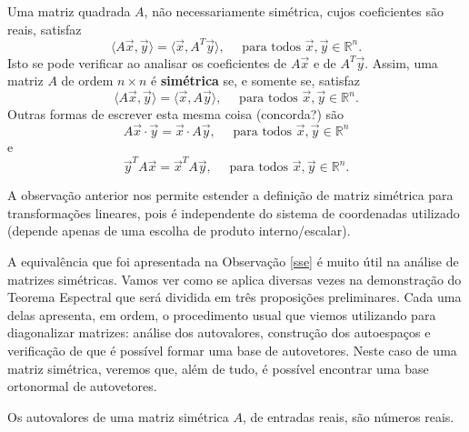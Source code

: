 \documentclass[../livro.tex]{subfiles}
\begin{document}
\begin{remark}\label{sse}
	Uma matriz quadrada $A$, não necessariamente simétrica, cujos coeficientes são reais, satisfaz
	\begin{equation}
	\langle A \vec{x}, \vec{y} \rangle = \langle\vec{x}, A^T \vec{y}\rangle, \quad \text{ para todos } \vec{x}, \vec{y} \in \mathbb{R}^n.
	\end{equation} Isto se pode verificar ao analisar os coeficientes de $A \vec{x}$ e de $A^T \vec{y}$. Assim, uma matriz $A$ de ordem $n \times n$ é \textbf{simétrica} se, e somente se, satisfaz
	\begin{equation}
	\langle A \vec{x}, \vec{y} \rangle = \langle\vec{x}, A \vec{y}\rangle, \quad \text{ para todos } \vec{x}, \vec{y} \in \mathbb{R}^n.
	\end{equation}
	Outras formas de escrever esta mesma coisa (concorda?) são
	\begin{equation}
	A \vec{x} \cdot \vec{y} = \vec{x} \cdot A \vec{y}, \quad \text{ para todos } \vec{x}, \vec{y} \in \mathbb{R}^n
	\end{equation} e 
	\begin{equation}
	\vec{y}^T A \vec{x} = \vec{x}^T A \vec{y}, \quad \text{ para todos } \vec{x}, \vec{y} \in \mathbb{R}^n.
	\end{equation}
\end{remark}

\begin{remark}
	A observação anterior nos permite estender a definição de matriz simétrica para transformações lineares, pois é independente do sistema de coordenadas utilizado (depende apenas de uma escolha de produto interno/escalar). 
\end{remark}

A equivalência que foi apresentada na Observação \ref{sse} é muito útil na análise de matrizes simétricas. Vamos ver como se aplica diversas vezes na demonstração do Teorema Espectral que será dividida em três proposições preliminares. Cada uma delas apresenta, em ordem, o procedimento usual que viemos utilizando para diagonalizar matrizes: análise dos autovalores, construção dos autoespaços e verificação de que é possível formar uma base de autovetores. Neste caso de uma matriz simétrica, veremos que, além de tudo, é possível encontrar uma base ortonormal de autovetores.

\begin{proposition}\label{reais}
	Os autovalores de uma matriz simétrica $A$, de entradas reais, são números reais.
\end{proposition}
\end{document}
